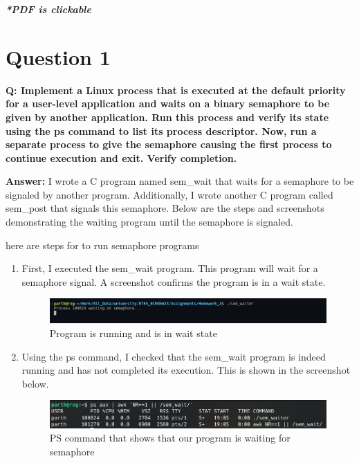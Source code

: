 \documentclass[a4paper,11pt]{article}%
\newenvironment{qanda}{\setlength{\parindent}{0pt}}{\bigskip}
\newcommand{\Q}{\bigskip\bfseries Q: }
\newcommand{\A}{\par\textbf{Answer: } \normalfont}
\begin{document}



\pagebreak

\tableofcontents
\listoffigures
\listoftables
\vfill
\begin{center}
	\textbf{\textit{*PDF is clickable}}
\end{center}

\pagebreak



\begin{qanda}

	\section{Question 1}
	\Q  Implement a Linux process that is executed at the default priority for a user-level application and waits on a binary semaphore to be given by another application. Run this process and verify its state using the ps command to list its process descriptor. Now, run a separate process to give the semaphore causing the first process to continue execution and exit. Verify completion.
	\A
	I wrote a C program named sem\_wait that waits for a semaphore to be signaled by another program. Additionally, I wrote another C program called sem\_post that signals this semaphore. Below are the steps and screenshots demonstrating the waiting program until the semaphore is signaled.

	here are steps for to run semaphore programs
	\begin{enumerate}
		\item First, I executed the sem\_wait program. This program will wait for a semaphore signal. A screenshot confirms the program is in a wait state.

		      \begin{figure}[!h]
			      \centering
			      \includegraphics[scale=0.6]{figures/sem_waiter.png}
			      \caption{Program is running and is in wait state}
		      \end{figure}
		\item Using the ps command, I checked that the sem\_wait program is indeed running and has not completed its execution. This is shown in the screenshot below.
		      \begin{figure}[!h]
			      \centering
			      \includegraphics[scale=0.6]{figures/ps_sem_waiter.png}
			      \caption{PS command that shows that our program is waiting for semaphore}


\end{figure}
\end{enumerate}
\end{qanda}
\end{document}
